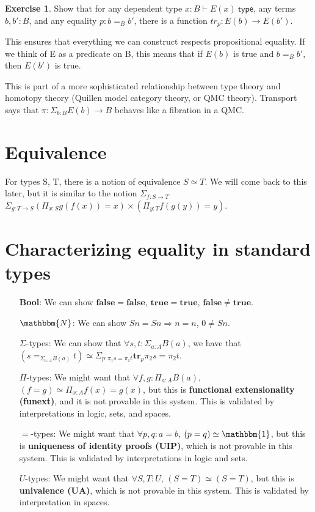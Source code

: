 \documentclass{amsart}
\theoremstyle{definition}
\newtheorem{ex}{Exercise}[section]
\newcommand{\N}{\mathbbm{N}}
\newcommand{\type}{\ensuremath{\mathsf{~type}}}
\begin{document}
\begin{ex}
    Show that for any dependent type $x : B \vdash E(x) \type $, any terms $b, b' : B$, and any equality $p : b \mathbf{=}_B b'$, there is a function $tr_p : E(b) \rightarrow E(b')$.
\end{ex}
This ensures that everything we can construct respects propositional equality. If we think of E as a predicate on B, this means that if $E(b)$ is true and $b \mathbf{=}_B b'$, then $E(b')$ is true.

This is part of a more sophisticated relationship between type theory and homotopy theory (Quillen model category theory, or QMC theory). Transport says that $\pi : \Sigma_{b : B} E(b) \rightarrow B$ behaves like a fibration in a QMC.

\section{Equivalence}
For types S, T, there is a notion of equivalence $S \simeq T$. We will come back to this later, but it is similar to the notion $\Sigma_{f : S \rightarrow T}$ $\Sigma_{g : T \rightarrow S} (\Pi_{x : S} g(f (x)) = x) \times (\Pi_{y : T} f(g(y)) = y)$.

\section{Characterizing equality in standard types}

\begin{itemize}
\item[\textbf{Bool}:] We can show $\mathbf{false} = \mathbf{false}$,
$\mathbf{true} = \mathbf{true}$,
$\mathbf{false} \neq \mathbf{true}$.
\item[$\N$:] We can show $S n = S n \Rightarrow n = n$, $0 \neq S n$.
\item[$\Sigma$-types:] We can show that $\forall s, t : \Sigma_{a : A} B(a)$, we have that $(s \mathbf{=}_{\Sigma_{a : A} B(a)} t) \simeq \Sigma_{p : \pi_1 s = \pi_1 t} \mathbf{tr}_p \pi_2 s = \pi_2 t$.
\item[$\Pi$-types:] We might want that $\forall f, g : \Pi_{a : A} B(a)$, $(f = g) \simeq \Pi_{x : A} f(x) = g(x)$, but this is \textbf{functional extensionality (funext)}, and it is not provable in this system. This is validated by interpretations  in logic, sets, and spaces.
\item[$=$-types:] We might want that $\forall p, q : a = b$, $(p = q) \simeq \mathbbm{1}$, but this is \textbf{uniqueness of identity proofs (UIP)}, which is not provable in this system. This is validated by interpretations in logic and sets. 
\item[$U$-types:] We might want that $\forall S, T : U$, $(S = T) \simeq (S = T)$, but this is \textbf{univalence (UA)}, which is not provable in this system. This is validated by interpretation in spaces.
\end{itemize}
\end{document}
